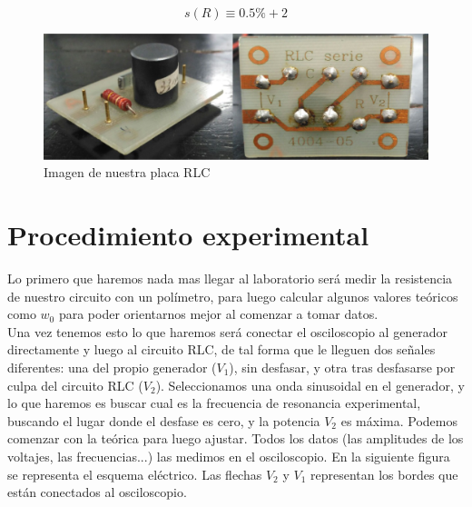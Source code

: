 \documentclass[12pt,a4paper]{article}
\begin{document}
\begin{itemize}
$$ s(R) \equiv 0.5 \%  + 2$$


\begin{figure}[h!] \centering
\includegraphics[scale=0.4]{RLC.png}
\caption{Imagen de nuestra placa RLC}
\label{Fig:placa-RLC}
\end{figure}


\end{itemize}

\newpage

\section{Procedimiento experimental}

Lo primero que haremos nada mas llegar al laboratorio será medir la resistencia de nuestro circuito con un polímetro, para luego calcular algunos valores teóricos como $w_0$ para poder orientarnos mejor al comenzar a tomar datos. \\

Una vez tenemos esto lo que haremos será conectar el osciloscopio al generador directamente y luego al circuito RLC, de tal forma que le lleguen dos señales diferentes: una del propio generador ($V_1$), sin desfasar, y otra tras desfasarse por culpa del circuito RLC ($V_2$). Seleccionamos una onda sinusoidal en el generador, y lo  que haremos es buscar cual es la frecuencia de resonancia experimental, buscando el lugar donde el desfase es cero, y la potencia $V_2$ es máxima. Podemos comenzar con la teórica para luego ajustar. Todos los datos (las amplitudes de los voltajes, las frecuencias...) las medimos en el osciloscopio. En la siguiente figura se representa el esquema eléctrico. Las flechas $V_2$ y $V_1$ representan los bordes que están conectados al osciloscopio.   \\
\end{document}
